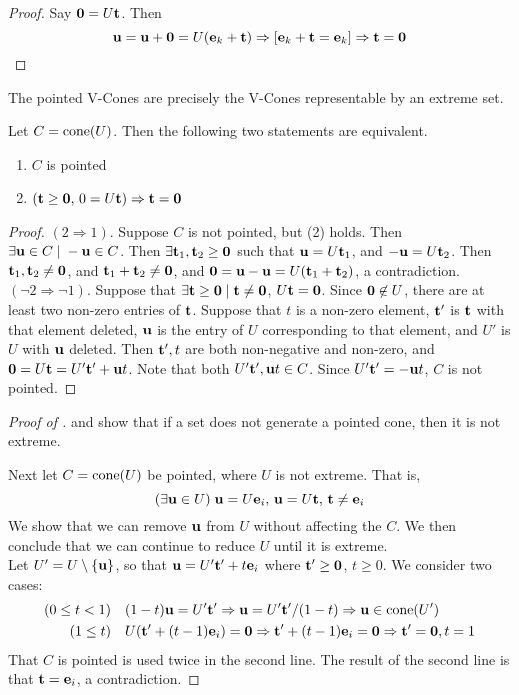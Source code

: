 \begin{proof}
	Say $\mathbf{0} = U\mathbf{t}$.  Then
	\[ \mathbf{u} = \mathbf{u}+\mathbf{0} = U(\mathbf{e}_k+\mathbf{t}) \Rightarrow [\mathbf{e}_k+\mathbf{t} = \mathbf{e}_k] \Rightarrow \mathbf{t} = \mathbf{0} \]
\end{proof}

\begin{Prop}\label{extreme_vcones}
	The pointed V-Cones are precisely the V-Cones representable by an extreme set.
\end{Prop}

\begin{Lemma}\label{pointed_independence}
	Let $C = \operatorname{cone}(U)$.  Then the following two statements are equivalent.
	\begin{enumerate}
		\item $C$ is pointed
		\item $(\mathbf{t}\geq\mathbf{0},\,0=U\mathbf{t})\Rightarrow \mathbf{t}=\mathbf{0}$
	\end{enumerate}
\end{Lemma}

\begin{proof}
	$(2\Rightarrow 1)$.  Suppose $C$ is not pointed, but (2) holds.  Then $\exists \mathbf{u}\in C\;|\; -\mathbf{u}\in C$.  Then $\exists \mathbf{t}_1,\mathbf{t}_2 \geq \mathbf{0}$ such that $\mathbf{u} = U\mathbf{t}_1$, and $-\mathbf{u} = U\mathbf{t}_2$.  Then $\mathbf{t}_1,\mathbf{t}_2 \neq \mathbf{0}$, and $\mathbf{t}_1 + \mathbf{t}_2 \neq \mathbf{0}$, and $\mathbf{0} = \mathbf{u}-\mathbf{u} = U(\mathbf{t}_1+\mathbf{t}_2)$, a contradiction.\\
	$(\neg 2\Rightarrow \neg 1)$.  Suppose that $\exists \mathbf{t}\geq\mathbf{0}\;|\;\mathbf{t}\neq\mathbf{0}$, $U\mathbf{t}=\mathbf{0}$.  Since $\mathbf{0}\not\in U$, there are at least two non-zero entries of $\mathbf{t}$.  Suppose that $t$ is a non-zero element, $\mathbf{t}'$ is $\mathbf{t}$ with that element deleted, $\mathbf{u}$ is the entry of $U$ corresponding to that element, and $U'$ is $U$ with $\mathbf{u}$ deleted.  Then $\mathbf{t}',t$ are both non-negative and non-zero, and $\mathbf{0} = U\mathbf{t} = U'\mathbf{t}' + \mathbf{u} t$.  Note that both $U'\mathbf{t}',\mathbf{u} t \in C$.  Since $U'\mathbf{t}' = -\mathbf{u} t$, $C$ is not pointed.
\end{proof}

\begin{proof}[Proof of ]
	 and  show that if a set does not generate a pointed cone, then it is not extreme.

	Next let $C = \operatorname{cone}(U)$ be pointed, where $U$ is not extreme.  That is,
	\[(\exists \mathbf{u}\in U)\; \mathbf{u}=U\mathbf{e}_i,\, \mathbf{u} = U\mathbf{t},\, \mathbf{t}\neq\mathbf{e}_i \]
	We show that we can remove $\mathbf{u}$ from $U$ without affecting the $C$.  We then conclude that we can continue to reduce $U$ until it is extreme.\\
	Let $U' = U\setminus\left\{\mathbf{u}\right\}$, so that $\mathbf{u} = U'\mathbf{t}' + t\mathbf{e}_i$ where $\mathbf{t}'\geq\mathbf{0}$, $t\geq 0$.  We consider two cases:
	\begin{align*}
		(0\leq t<1) & \quad (1-t)\mathbf{u} = U'\mathbf{t}' \Rightarrow \mathbf{u} = U'\mathbf{t}'/(1-t) \Rightarrow \mathbf{u} \in \operatorname{cone}(U') \\
		(1 \leq t)  & \quad U(\mathbf{t}'+(t-1)\mathbf{e}_i)=\mathbf{0} \Rightarrow \mathbf{t}'+(t-1)\mathbf{e}_i=\mathbf{0} \Rightarrow \mathbf{t}'=\mathbf{0},t=1
	\end{align*}
	That $C$ is pointed is used twice in the second line.  The result of the second line is that $\mathbf{t}=\mathbf{e}_i$, a contradiction.
\end{proof}

